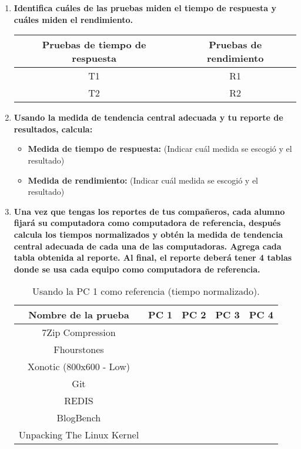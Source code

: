\documentclass[12pt]{article}
\newcommand{\pl}[1]{\item \textbf{ #1 }}
\begin{document}
\begin{enumerate}[label=(\arabic{section}.\arabic{subsection}.\arabic{enumi})]
    \pl{Identifica cuáles de las pruebas miden el tiempo de respuesta y cuáles miden el rendimiento.}
    \begin{table}[htb]
        \centering
        \begin{tabular}{|c|c|}
        \hline
        Pruebas de tiempo de respuesta & Pruebas de rendimiento \\
        \hline
        T1 & R1 \\
        \hline
        T2 & R2 \\
        \hline
        \end{tabular}
    \end{table}\par

    \pl{Usando la medida de tendencia central adecuada y tu reporte de resultados, calcula:}
    \begin{itemize}
        \pl{Medida de tiempo de respuesta:}(Indicar cuál medida se escogió y el resultado)\par
    
        \pl{Medida de rendimiento:} (Indicar cuál medida se escogió y el resultado)\par
    \end{itemize}

    \pl{Una vez que tengas los reportes de tus compañeros, cada alumno fijará su computadora como computadora de referencia, después calcula los tiempos normalizados y obtén la medida de tendencia central adecuada de cada una de las computadoras. Agrega cada tabla obtenida al reporte. Al final, el reporte deberá tener 4 tablas donde se usa cada equipo como computadora de referencia.}

    \begin{table}[htb]
        \centering
        \begin{tabular}{|c|c|c|c|c|}
        \hline
        \textbf{Nombre de la prueba} & \textbf{PC 1} & \textbf{PC 2} & \textbf{PC 3} & \textbf{PC 4}\\
        \hline
        7Zip Compression & & & & \\
        \hline
        Fhourstones & & & & \\
        \hline
        Xonotic (800x600 - Low) & & & &  \\
        \hline
        Git & & & &  \\
        \hline
        REDIS & & & &  \\
        \hline
        BlogBench & & & &  \\
        \hline
        Unpacking The Linux Kernel & & & & \\
        \hline
        \end{tabular}
        \caption{Usando la PC 1 como referencia (tiempo normalizado).}
    \end{table}


\end{enumerate}
\end{document}
